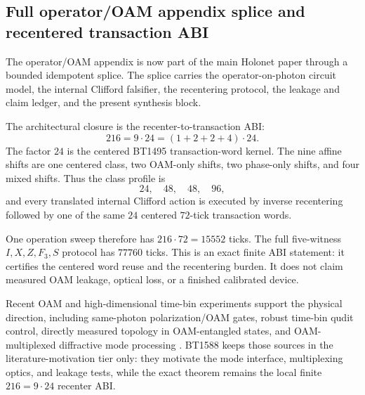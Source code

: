 \subsection{Full operator/OAM appendix splice and recentered transaction ABI}
\label{sec:bt1586-bt1588-oam-abi}

The operator/OAM appendix is now part of the main Holonet paper through a bounded
idempotent splice.  The splice carries the operator-on-photon circuit model, the
internal Clifford falsifier, the recentering protocol, the leakage and claim
ledger, and the present synthesis block.

The architectural closure is the recenter-to-transaction ABI:
\[
  216 = 9\cdot24
      = (1+2+2+4)\cdot24.
\]
The factor \(24\) is the centered BT1495 transaction-word kernel.  The nine
affine shifts are one centered class, two OAM-only shifts, two phase-only
shifts, and four mixed shifts.  Thus the class profile is
\[
  24,\quad 48,\quad 48,\quad 96,
\]
and every translated internal Clifford action is executed by inverse
recentering followed by one of the same \(24\) centered \(72\)-tick transaction
words.

One operation sweep therefore has \(216\cdot72=15552\) ticks.  The full
five-witness \(I,X,Z,F_3,S\) protocol has \(77760\) ticks.  This is an exact
finite ABI statement: it certifies the centered word reuse and the recentering
burden.  It does not claim measured OAM leakage, optical loss, or a finished
calibrated device.

Recent OAM and high-dimensional time-bin experiments support the physical
direction, including same-photon polarization/OAM gates, robust time-bin qudit
control, directly measured topology in OAM-entangled states, and OAM-multiplexed
diffractive mode processing
\cite{oam-toffoli-prl2024,timebin-qudit-prl2025,oam-topology-natcomm2025,oam-multiplexing-natphot2026}.
BT1588 keeps those sources in the literature-motivation tier only: they motivate
the mode interface, multiplexing optics, and leakage tests, while the exact
theorem remains the local finite \(216=9\cdot24\) recenter ABI.
